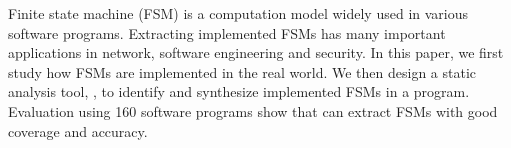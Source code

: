 Finite state machine (FSM) is a computation model widely 
used in various software programs. 
Extracting implemented FSMs has many important applications in 
network, software engineering and security. 
In this paper, we first study how FSMs are implemented in the real world.
We then design a static analysis tool, \Tool{}, to identify and synthesize 
implemented FSMs in a program. 
Evaluation using 160 software programs show that 
\Tool{} can extract FSMs with good coverage and accuracy. 
